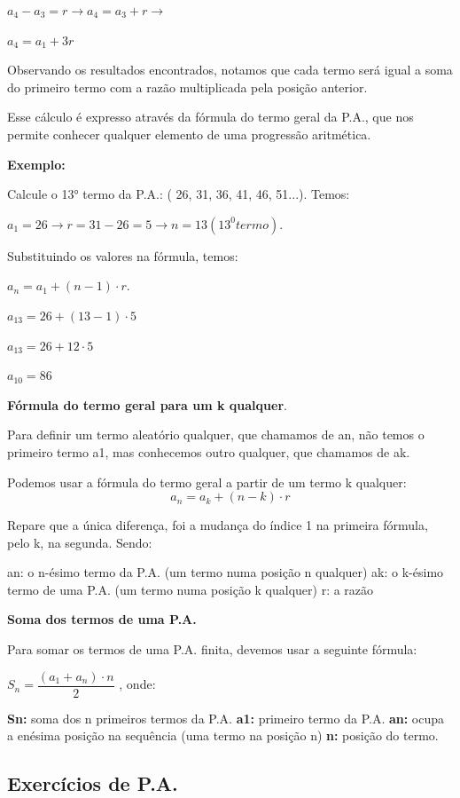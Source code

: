 \begin{multicols*}{2}
	{$ a_4 - a_3 = r \to a_4 = a_3 + r \to$}

	{$a_4 = a_1 + 3r $}

	Observando os resultados encontrados, notamos que cada termo será igual a soma do primeiro termo com a razão multiplicada pela posição anterior.

	Esse cálculo é expresso através da fórmula do termo geral da P.A., que nos permite conhecer qualquer elemento de uma progressão aritmética.

	\textbf{Exemplo:}

	Calcule o 13° termo da P.A.: ( 26, 31, 36, 41, 46, 51...). Temos:

	$ a_1 = 26 \to r = 31 - 26 = 5 \to n = 13 (13^0 termo)$.

	\color{black}Substituindo os valores na fórmula, temos:

	$ a_n = a_1 + (n - 1) \cdot r $.

	$ a_{13} = 26 + (13 - 1) \cdot 5 $

	$ a_{13} = 26 + 12 \cdot 5 $

	$ a_{10} = 86 $\color{black}

	\textbf{Fórmula do termo geral para um k qualquer}.

	Para definir um termo aleatório qualquer, que chamamos de an, não temos o primeiro termo a1, mas conhecemos outro qualquer, que chamamos de ak.

	Podemos usar a fórmula do termo geral a partir de um termo k qualquer:
	\[ a_n = a_k + (n - k) \cdot r \]

	Repare que a única diferença, foi a mudança do índice 1 na primeira fórmula, pelo k, na segunda. Sendo:

	an: o n-ésimo termo da P.A. (um termo numa posição n qualquer)
	ak: o k-ésimo termo de uma P.A. (um termo numa posição k qualquer)
	r: a razão

	\textbf{Soma dos termos de uma P.A.}

	Para somar os termos de uma P.A. finita, devemos usar a seguinte fórmula:

	{$ S_n = \dfrac{(a_1 + a_n) \cdot n}{2} $}	, onde:

	\textbf{Sn:} soma dos n primeiros termos da P.A.
	\textbf{a1:} primeiro termo da P.A.
	\textbf{an:} ocupa a enésima posição na sequência (uma termo na posição n)
	\textbf{n:} posição do termo.

	\subsection*{Exercícios de P.A.}


\end{multicols*}
